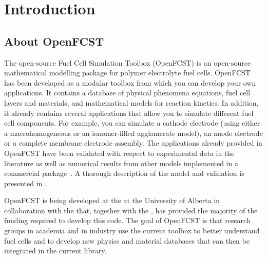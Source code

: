 \chapter{Introduction}
\section{About OpenFCST}

The open-source Fuel Cell Simulation Toolbox (OpenFCST) is an open-source mathematical modelling package for polymer electrolyte fuel cells. OpenFCST has been developed as a modular toolbox from which you can develop your own applications. It contains a database of physical phenomena equations, fuel cell layers and materials, and mathematical models for reaction kinetics. In addition, it already contains several applications that allow you to simulate different fuel cell components. For example, you can simulate a cathode electrode (using either a macrohomogeneous or an ionomer-filled agglomerate model), an anode electrode or a complete membrane electrode assembly. The applications already provided in OpenFCST have been validated with respect to experimental data in the literature \cite{Dobson12} as well as numerical results from other models implemented in a commercial package~\cite{Secanell07}. A thorough description of the model and validation is presented in \cite{Secanell07}.

OpenFCST is being developed at the  at the University of Alberta in collaboration with the  that, together with the , has provided the majority of the funding required to develop this code. The goal of OpenFCST is that research groups in academia and in industry use the current toolbox to better understand fuel cells and to develop new physics and material databases that can then be integrated in the current library.

